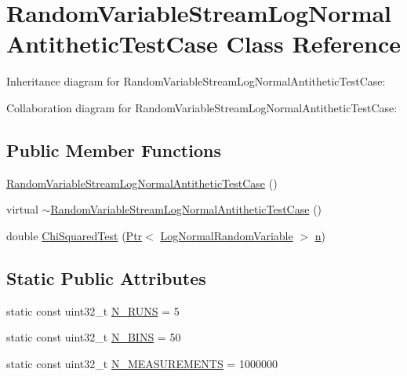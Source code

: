 \hypertarget{classRandomVariableStreamLogNormalAntitheticTestCase}{}\section{Random\+Variable\+Stream\+Log\+Normal\+Antithetic\+Test\+Case Class Reference}
\label{classRandomVariableStreamLogNormalAntitheticTestCase}


Inheritance diagram for Random\+Variable\+Stream\+Log\+Normal\+Antithetic\+Test\+Case\+:


Collaboration diagram for Random\+Variable\+Stream\+Log\+Normal\+Antithetic\+Test\+Case\+:
\subsection*{Public Member Functions}
\begin{DoxyCompactItemize}
\item 
\hyperlink{classRandomVariableStreamLogNormalAntitheticTestCase_a2d97581f0e7d63dfd837adf14223db1c}{Random\+Variable\+Stream\+Log\+Normal\+Antithetic\+Test\+Case} ()
\item 
virtual \hyperlink{classRandomVariableStreamLogNormalAntitheticTestCase_a0e4ab5235cf9757926cb33756663957b}{$\sim$\+Random\+Variable\+Stream\+Log\+Normal\+Antithetic\+Test\+Case} ()
\item 
double \hyperlink{classRandomVariableStreamLogNormalAntitheticTestCase_acea054fec1e48e3d210b5b378c63f110}{Chi\+Squared\+Test} (\hyperlink{classns3_1_1Ptr}{Ptr}$<$ \hyperlink{classns3_1_1LogNormalRandomVariable}{Log\+Normal\+Random\+Variable} $>$ \hyperlink{lte__link__budget__x2__handover__measures_8m_abdb05bc5a064cf642a06c83b3392f148}{n})
\end{DoxyCompactItemize}
\subsection*{Static Public Attributes}
\begin{DoxyCompactItemize}
\item 
static const uint32\+\_\+t \hyperlink{classRandomVariableStreamLogNormalAntitheticTestCase_aab97d250723c997e23fb335f8791b6c9}{N\+\_\+\+R\+U\+NS} = 5
\item 
static const uint32\+\_\+t \hyperlink{classRandomVariableStreamLogNormalAntitheticTestCase_ae77d74151c86fca9b393757cf5c222f9}{N\+\_\+\+B\+I\+NS} = 50
\item 
static const uint32\+\_\+t \hyperlink{classRandomVariableStreamLogNormalAntitheticTestCase_aecdc00cd056a3e0ebea556d2209df9e2}{N\+\_\+\+M\+E\+A\+S\+U\+R\+E\+M\+E\+N\+TS} = 1000000
\end{DoxyCompactItemize}
